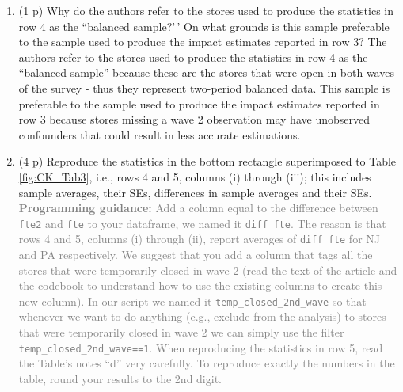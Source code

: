 \documentclass[
]{article}
\begin{document}
\begin{enumerate}
\def\labelenumi{\alph{enumi}.}
\item
  (1 p) Why do the authors refer to the stores used to produce the
  statistics in row 4 as the ``balanced sample?'\,' On what grounds is
  this sample preferable to the sample used to produce the impact
  estimates reported in row 3? The authors refer to the stores used to
  produce the statistics in row 4 as the ``balanced sample'' because
  these are the stores that were open in both waves of the survey - thus
  they represent two-period balanced data. This sample is preferable to
  the sample used to produce the impact estimates reported in row 3
  because stores missing a wave 2 observation may have unobserved
  confounders that could result in less accurate estimations.
\item
  (4 p) Reproduce the statistics in the bottom rectangle superimposed to
  Table \ref{fig:CK_Tab3}, i.e., rows 4 and 5, columns (i) through
  (iii); this includes sample averages, their SEs, differences in sample
  averages and their SEs.
  \textcolor{gray}{\textbf{Programming guidance:} Add a column equal to the difference between \texttt{fte2} and \texttt{fte} to your dataframe, we named it \texttt{diff\_fte}. The reason is that rows 4 and 5, columns (i) through (ii), report averages of \texttt{diff\_fte} for NJ and PA respectively. We suggest that you add a column that tags all the stores that were temporarily closed in wave 2 (read the text of the article and the codebook to understand how to use the existing columns to create this new column). In our script we named it \texttt{temp\_closed\_2nd\_wave} so that whenever we want to do anything (e.g., exclude from the analysis) to stores that were temporarily closed in wave 2 we can simply use the filter \texttt{temp\_closed\_2nd\_wave==1}. When reproducing the statistics in row 5, read the Table's notes ``d'' very carefully. To reproduce exactly the numbers in the table, round your results to the 2nd digit.}
\end{enumerate}
\end{document}
